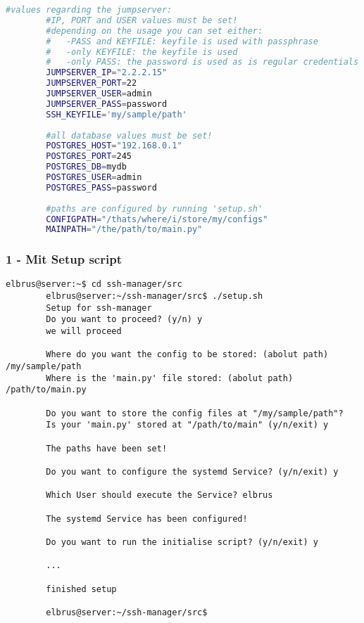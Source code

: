 \documentclass{article}
\begin{document}
	\lstset{style=files}
	\begin{lstlisting}[caption={Anhand von '.env.example' eigene '.env' Datei anlegen}, language=bash]
		#values regarding the jumpserver:
		#IP, PORT and USER values must be set!
		#depending on the usage you can set either:
		#   -PASS and KEYFILE: keyfile is used with passphrase
		#   -only KEYFILE: the keyfile is used
		#   -only PASS: the password is used as is regular credentials
		JUMPSERVER_IP="2.2.2.15"
		JUMPSERVER_PORT=22
		JUMPSERVER_USER=admin
		JUMPSERVER_PASS=password
		SSH_KEYFILE='my/sample/path'
		
		#all database values must be set!
		POSTGRES_HOST="192.168.0.1"
		POSTGRES_PORT=245
		POSTGRES_DB=mydb
		POSTGRES_USER=admin
		POSTGRES_PASS=password
		
		#paths are configured by running 'setup.sh'
		CONFIGPATH="/thats/where/i/store/my/configs"
		MAINPATH="/the/path/to/main.py"
	\end{lstlisting}
	
	\newpage
	\subsubsection{1 - Mit Setup script}
	\lstset{style=commands}
	\begin{lstlisting}[caption={Ausführen des setup Scripts}]
		elbrus@server:~$ cd ssh-manager/src
		elbrus@server:~/ssh-manager/src$ ./setup.sh
		Setup for ssh-manager
		Do you want to proceed? (y/n) y
		we will proceed
		
		Where do you want the config to be stored: (abolut path) /my/sample/path
		Where is the 'main.py' file stored: (abolut path) /path/to/main.py
		
		Do you want to store the config files at "/my/sample/path"? 
		Is your 'main.py' stored at "/path/to/main" (y/n/exit) y
		
		The paths have been set!
		
		Do you want to configure the systemd Service? (y/n/exit) y
		
		Which User should execute the Service? elbrus
		
		The systemd Service has been configured!
		
		Do you want to run the initialise script? (y/n/exit) y
		
		...
		
		finished setup
		
		elbrus@server:~/ssh-manager/src$
	\end{lstlisting}
	
\end{document}
